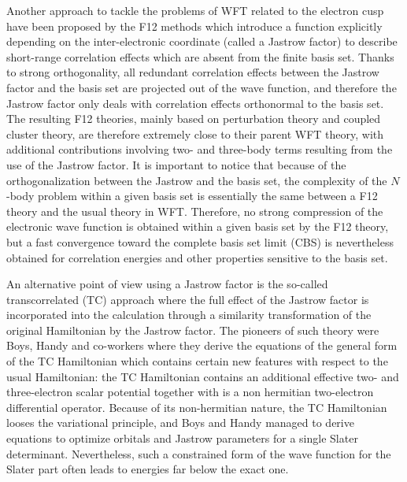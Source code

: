 \documentclass[aip,jcp,reprint,noshowkeys,superscriptaddress]{revtex4-1}
\begin{document}
Another approach to tackle the problems of WFT related to the electron cusp have been proposed by the F12 methods which introduce a function explicitly depending on the inter-electronic coordinate\cite{Ten-TCA-12,TenNog-WIREs-12,HatKloKohTew-CR-12, KonBisVal-CR-12, GruHirOhnTen-JCP-17, MaWer-WIREs-18} (called a Jastrow factor) to describe short-range correlation effects which are absent from the finite basis set. Thanks to strong orthogonality, 
all redundant correlation effects between the Jastrow factor and the basis set are projected out of the wave function, 
and therefore the Jastrow factor only deals with correlation effects orthonormal to the basis set. 
The resulting F12 theories, mainly based on perturbation theory and coupled cluster theory, are therefore 
extremely close to their parent WFT theory, with additional contributions involving two- and three-body terms resulting from the use of the Jastrow factor. 
It is important to notice that because of the orthogonalization between the Jastrow and the basis set, 
the complexity of the $N$-body problem within a given basis set is essentially the same between a F12 theory and the usual theory in WFT. Therefore, no strong compression of the electronic wave function is obtained within a given basis set by the F12 theory, 
but a fast convergence toward the complete basis set limit (CBS) is nevertheless obtained for correlation energies and other properties sensitive to the basis set.  

An alternative point of view using a Jastrow factor is the so-called transcorrelated (TC) approach where the full effect of the Jastrow factor is incorporated into the calculation through a similarity transformation of the original Hamiltonian by the Jastrow factor. 
The pioneers of such theory were Boys, Handy and co-workers\cite{BoyHan-PRSLA-69,BoyHanLin-1-PRSLA-69,BoyHanLin-2-PRSLA-69} where they derive the equations of the general form of the TC Hamiltonian which contains certain new features with respect to the usual Hamiltonian: the TC Hamiltonian contains an additional effective two- and three-electron scalar potential together with is a non hermitian two-electron differential operator. Because of its non-hermitian nature, the TC Hamiltonian looses the variational principle, and Boys and Handy managed to derive equations to optimize orbitals and Jastrow parameters for a single Slater determinant. Nevertheless, such a constrained form of the wave function for the Slater part often leads to energies far below the exact one. 
\end{document}
